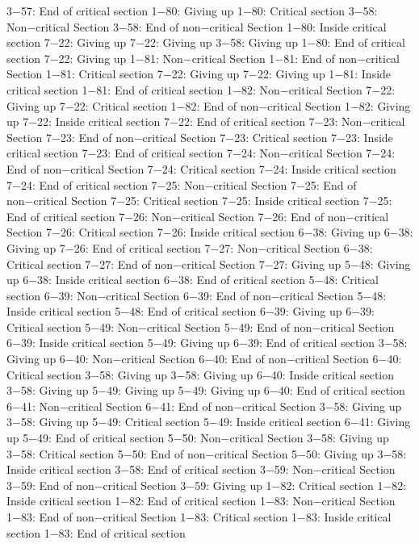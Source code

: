 3−57: End of critical section
1−80: Giving up
1−80: Critical section
3−58: Non−critical Section
3−58: End of non−critical Section
1−80: Inside critical section
7−22: Giving up
7−22: Giving up
3−58: Giving up
1−80: End of critical section
7−22: Giving up
1−81: Non−critical Section
1−81: End of non−critical Section
1−81: Critical section
7−22: Giving up
7−22: Giving up
1−81: Inside critical section
1−81: End of critical section
1−82: Non−critical Section
7−22: Giving up
7−22: Critical section
1−82: End of non−critical Section
1−82: Giving up
7−22: Inside critical section
7−22: End of critical section
7−23: Non−critical Section
7−23: End of non−critical Section
7−23: Critical section
7−23: Inside critical section
7−23: End of critical section
7−24: Non−critical Section
7−24: End of non−critical Section
7−24: Critical section
7−24: Inside critical section
7−24: End of critical section
7−25: Non−critical Section
7−25: End of non−critical Section
7−25: Critical section
7−25: Inside critical section
7−25: End of critical section
7−26: Non−critical Section
7−26: End of non−critical Section
7−26: Critical section
7−26: Inside critical section
6−38: Giving up
6−38: Giving up
7−26: End of critical section
7−27: Non−critical Section
6−38: Critical section
7−27: End of non−critical Section
7−27: Giving up
5−48: Giving up
6−38: Inside critical section
6−38: End of critical section
5−48: Critical section
6−39: Non−critical Section
6−39: End of non−critical Section
5−48: Inside critical section
5−48: End of critical section
6−39: Giving up
6−39: Critical section
5−49: Non−critical Section
5−49: End of non−critical Section
6−39: Inside critical section
5−49: Giving up
6−39: End of critical section
3−58: Giving up
6−40: Non−critical Section
6−40: End of non−critical Section
6−40: Critical section
3−58: Giving up
3−58: Giving up
6−40: Inside critical section
3−58: Giving up
5−49: Giving up
5−49: Giving up
6−40: End of critical section
6−41: Non−critical Section
6−41: End of non−critical Section
3−58: Giving up
3−58: Giving up
5−49: Critical section
5−49: Inside critical section
6−41: Giving up
5−49: End of critical section
5−50: Non−critical Section
3−58: Giving up
3−58: Critical section
5−50: End of non−critical Section
5−50: Giving up
3−58: Inside critical section
3−58: End of critical section
3−59: Non−critical Section
3−59: End of non−critical Section
3−59: Giving up
1−82: Critical section
1−82: Inside critical section
1−82: End of critical section
1−83: Non−critical Section
1−83: End of non−critical Section
1−83: Critical section
1−83: Inside critical section
1−83: End of critical section
